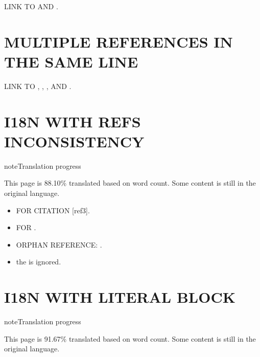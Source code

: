 \documentclass[letterpaper,10pt,english]{sphinxmanual}
\begin{document}
\sphinxAtStartPar
LINK TO  AND .


\chapter{MULTIPLE REFERENCES IN THE SAME LINE}
\label{\detokenize{external_links:multiple-references-in-the-same-line}}
\sphinxAtStartPar
LINK TO {\hyperref[\detokenize{external_links:i18n-with-external-links}]{}}, , ,  AND .

\sphinxstepscope


\chapter{I18N WITH REFS INCONSISTENCY}
\label{\detokenize{refs_inconsistency:i18n-with-refs-inconsistency}}\label{\detokenize{refs_inconsistency::doc}}
\begin{sphinxadmonition}{note}{Translation progress}

\sphinxAtStartPar
This page is 88.10\% translated based on word count. Some content is still in the original language.
\end{sphinxadmonition}
\begin{itemize}
\item {} 
\sphinxAtStartPar
FOR CITATION {[}ref3{]}.

\item {} 
\sphinxAtStartPar
{} FOR .

\item {} 
\sphinxAtStartPar
ORPHAN REFERENCE: {\hyperref[\detokenize{refs_inconsistency:i18n-with-refs-inconsistency}]{}}.

\item {} 
\sphinxAtStartPar
the    is ignored.

\end{itemize}

\sphinxstepscope


\chapter{I18N WITH LITERAL BLOCK}
\label{\detokenize{literalblock:i18n-with-literal-block}}\label{\detokenize{literalblock::doc}}
\begin{sphinxadmonition}{note}{Translation progress}

\sphinxAtStartPar
This page is 91.67\% translated based on word count. Some content is still in the original language.
\end{sphinxadmonition}
\end{document}
